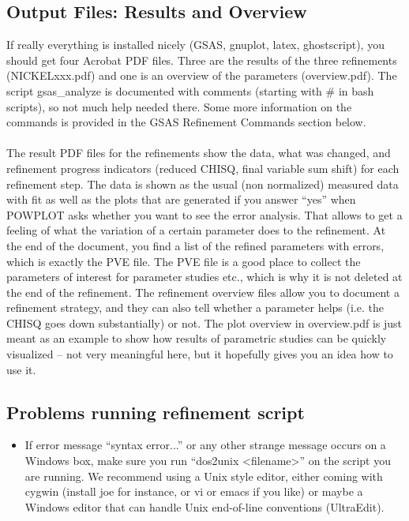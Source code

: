 \documentclass{article}
\begin{document}
\subsection{Output Files: Results and Overview}
If really everything is installed nicely (GSAS, gnuplot, latex, ghostscript), you should get four Acrobat PDF files. Three are the results of the three refinements (NICKELxxx.pdf) and one is an overview of the parameters (overview.pdf). The script gsas\_analyze is documented with comments (starting with \# in bash scripts), so not much help needed there. Some more information on the commands is provided in the GSAS Refinement Commands section below. \\ \\
The result PDF files for the refinements show  the data, what was changed, and refinement progress indicators (reduced CHISQ, final variable sum shift) for each refinement step. The data is shown as the usual (non normalized) measured data with fit as well as the plots that are generated if you answer ``yes'' when POWPLOT asks whether you want to see the error analysis. That allows to get a feeling of what the variation of a certain parameter does to the refinement. At the end of the document, you find a list of the refined parameters with errors, which is exactly the PVE file. The PVE file is a good place to collect the parameters of interest for parameter studies etc., which is why it is not deleted at the end of the refinement. The refinement overview files allow you to document a refinement strategy, and they can also tell whether a parameter helps (i.e. the CHISQ goes down substantially) or not. The plot overview in overview.pdf is just meant as an example to show how results of parametric studies can be quickly visualized -- not very meaningful here, but it hopefully gives you an idea how to use it.

\subsection{Problems running refinement script}

\begin{itemize}
	\item If error message ``syntax error...'' or any other strange message occurs on a Windows box, make sure you run ``dos2unix <filename>'' on the script you are running. We recommend using a Unix style editor, either coming with cygwin (install joe for instance, or vi or emacs if you like) or maybe a Windows editor that can handle Unix end-of-line conventions (UltraEdit).
\end{itemize}
\end{document}
